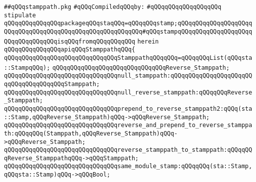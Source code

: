 \label{src/lib/compiler/front/typer-stuff/modules/stamppath.pkg}
\verb|##qQQqstamppath.pkg|\newline
\newline
\verb|#qQQqCompiledqQQqby:|\newline
\verb|#qQQqqQQqqQQqqQQqqQQq|\newline
\newline
\verb|stipulate|\newline
\verb|qQQqqQQqqQQqqQQqpackageqQQqstaqQQq=qQQqqQQqstamp;qQQqqQQqqQQqqQQqqQQqqQQqqQQqqQQqqQQqqQQqqQQqqQQqqQQqqQQqqQQq#qQQqstampqQQqqQQqqQQqqQQqqQQqqQQqqQQqqQQqqQQqisqQQqfromqQQqqQQqqQQq|\newline
\verb|herein|\newline
\newline
\verb|qQQqqQQqqQQqqQQqapiqQQqStamppathqQQq{|\newline
\newline
\verb|qQQqqQQqqQQqqQQqqQQqqQQqqQQqqQQqStamppathqQQqqQQq=qQQqqQQqList(qQQqsta::StampqQQq);|\newline
\newline
\verb|qQQqqQQqqQQqqQQqqQQqqQQqqQQqqQQqReverse_Stamppath;|\newline
\newline
\verb|qQQqqQQqqQQqqQQqqQQqqQQqqQQqqQQqnull_stamppath:qQQqqQQqqQQqqQQqqQQqqQQqqQQqqQQqqQQqqQQqStamppath;|\newline
\verb|qQQqqQQqqQQqqQQqqQQqqQQqqQQqqQQqnull_reverse_stamppath:qQQqqQQqReverse_Stamppath;|\newline
\verb|qQQqqQQqqQQqqQQqqQQqqQQqqQQqqQQqprepend_to_reverse_stamppath2:qQQq(sta::Stamp,qQQqReverse_Stamppath)qQQq->qQQqReverse_Stamppath;|\newline
\newline
\verb|qQQqqQQqqQQqqQQqqQQqqQQqqQQqqQQqreverse_and_prepend_to_reverse_stamppath:qQQqqQQq(Stamppath,qQQqReverse_Stamppath)qQQq->qQQqReverse_Stamppath;|\newline
\verb|qQQqqQQqqQQqqQQqqQQqqQQqqQQqqQQqreverse_stamppath_to_stamppath:qQQqqQQqReverse_StamppathqQQq->qQQqStamppath;|\newline
\newline
\verb|qQQqqQQqqQQqqQQqqQQqqQQqqQQqqQQqsame_module_stamp:qQQqqQQq(sta::Stamp,qQQqsta::Stamp)qQQq->qQQqBool;|\newline
